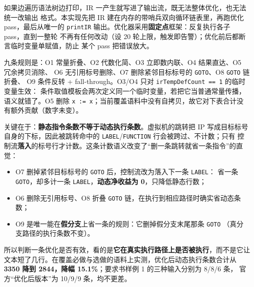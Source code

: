 \documentclass[11pt,a4paper]{ctexart}
\newcommand{\code}[1]{\texttt{#1}}
\begin{document}
如果边遍历语法树边打印，IR 一产生就写进了输出流，既无法整体优化，也无法统一改输出
格式。本实现先把 IR 建在内存的带哨兵双向循环链表里，再跑优化 pass，最后从唯一的
\code{printIR} 输出。优化器采用\textbf{固定点}框架：反复执行各子 pass，直到一整轮
不再有任何改动（设 20 轮上限，触发即告警）；优化前后都断言临时变量单赋值，防止
某个 pass 把错误放大。

九条规则是：O1 常量折叠、O2 代数化简、O3 立即数内联、O4 结果直达、O5 冗余拷贝消除、
O6 无引用标号删除、O7 删除紧邻目标标号的 \code{GOTO}、O8 \code{GOTO} 链折叠、
O9 条件反转 + fall-through。O3/O4 只对 \code{irTempDefCount == 1} 的临时变量生效：
条件取值模板会两次定义同一个临时变量，若把它当普通常量传播，语义就错了。O5 删除
\code{x := x}；当前覆盖语料中没有自拷贝，故它对下表合计没有额外贡献（数字未变）。

关键在于：\textbf{静态指令条数不等于动态执行条数}。虚拟机的跳转把 IP 写成目标标号
自身的下标，因此被跳转命中的 \code{LABEL}/\code{FUNCTION} 行会被跨过、不计数；只有
控制流\textbf{落入}的标号行才计数。这条计数语义改变了“删一条跳转就省一条指令”的直觉：

\begin{itemize}
\item O7 删掉紧邻目标标号的 \code{GOTO} 后，控制流改为落入下一条 \code{LABEL}：
      省一条 \code{GOTO}，却多计一条 \code{LABEL}，\textbf{动态净收益为 0}，只降低静态行数；
\item O6 删除无引用标号、O8 折叠 \code{GOTO} 链，在执行到相应路径时确实省动态条数；
\item O9 是唯一能在\textbf{假分支}上省一条的规则：它删掉假分支末尾那条 \code{GOTO}
      （真分支路径的执行条数不变）。
\end{itemize}

所以判断一条优化是否有效，看的是\textbf{它在真实执行路径上是否被执行}，而不是它让
文本短了几行。在覆盖必做与选做的语料上实测，优化后动态执行条数合计从
\textbf{3350 降到 2844，降幅 15.1\%}；要求书样例 1 的三种输入分别为 8/8/6 条，
官方“优化后版本”为 10/9/9 条，均不更差。
\end{document}
